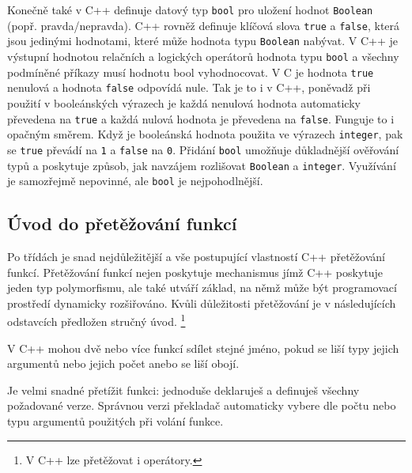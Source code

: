 {      Konečně také v C++ definuje datový typ \lstinline[basicstyle=\ttfamily]!bool! pro uložení  
      hodnot \lstinline[basicstyle=\ttfamily]!Boolean! (popř. pravda/nepravda). C++ rovněž definuje 
      klíčová slova \lstinline[basicstyle=\ttfamily]!true! a   
      \lstinline[basicstyle=\ttfamily]!false!, 
      která jsou jedinými hodnotami, které může hodnota typu 
      \lstinline[basicstyle=\ttfamily]!Boolean! nabývat. V C++ je výstupní hodnotou relačních a 
      logických operátorů hodnota typu \lstinline[basicstyle=\ttfamily]!bool! a všechny 
      podmíněné příkazy musí hodnotu bool vyhodnocovat. V C je hodnota 
      \lstinline[basicstyle=\ttfamily]!true! nenulová a hodnota 
      \lstinline[basicstyle=\ttfamily]!false! odpovídá nule. Tak je to i v C++, poněvadž při 
      použití v booleánských výrazech je každá nenulová hodnota automaticky převedena na    
      \lstinline[basicstyle=\ttfamily]!true! a každá nulová hodnota je převedena na 
      \lstinline[basicstyle=\ttfamily]!false!. Funguje to i opačným směrem. Když je booleánská 
      hodnota použita ve výrazech \lstinline[basicstyle=\ttfamily]!integer!, pak se 
      \lstinline[basicstyle=\ttfamily]!true! převádí na \lstinline[basicstyle=\ttfamily]!1! a 
      \lstinline[basicstyle=\ttfamily]!false! na \lstinline[basicstyle=\ttfamily]!0!. Přidání 
      \lstinline[basicstyle=\ttfamily]!bool! umožňuje důkladnější ověřování typů a poskytuje 
      způsob, jak navzájem rozlišovat \lstinline[basicstyle=\ttfamily]!Boolean! a     
      \lstinline[basicstyle=\ttfamily]!integer!. Využívání je samozřejmě nepovinné, ale
      \lstinline[basicstyle=\ttfamily]!bool! je nejpohodlnější.
  
    \subsection{Úvod do přetěžování funkcí}
      Po třídách je snad nejdůležitější a vše postupující vlastností C++ přetě\-žování funkcí. 
      Přetěžování funkcí nejen poskytuje mechanismus jímž C++ poskytuje jeden typ polymorfismu, ale 
      také utváří základ, na němž může být programovací prostředí dynamicky rozšiřováno. Kvůli 
      důležitosti přetěžování je v následujících odstavcích předložen stručný úvod. \footnote{V C++ 
      lze přetěžovat i operátory.}
  
      V C++ mohou dvě nebo více funkcí sdílet stejné jméno, pokud se liší typy jejich argumentů 
      nebo jejich počet anebo se liší obojí.
  
      Je velmi snadné přetížit funkci: jednoduše deklaruješ a definuješ všechny požadované verze. 
      Správnou verzi překladač automaticky vybere dle počtu nebo typu argumentů použitých při 
      volání funkce.
  
}
